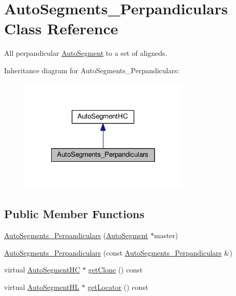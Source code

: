 \hypertarget{classKatabatic_1_1AutoSegments__Perpandiculars}{}\section{Auto\+Segments\+\_\+\+Perpandiculars Class Reference}
\label{classKatabatic_1_1AutoSegments__Perpandiculars}


All perpandicular \hyperlink{classKatabatic_1_1AutoSegment}{Auto\+Segment} to a set of aligneds.  




Inheritance diagram for Auto\+Segments\+\_\+\+Perpandiculars\+:\nopagebreak
\begin{figure}[H]
\begin{center}
\leavevmode
\includegraphics[width=230pt]{classKatabatic_1_1AutoSegments__Perpandiculars__inherit__graph}
\end{center}
\end{figure}
\subsection*{Public Member Functions}
\begin{DoxyCompactItemize}
\item 
\hyperlink{classKatabatic_1_1AutoSegments__Perpandiculars_ab5cb1a0042b95cb6bd56997cdfbf0e6f}{Auto\+Segments\+\_\+\+Perpandiculars} (\hyperlink{classKatabatic_1_1AutoSegment}{Auto\+Segment} $\ast$master)
\item 
\hyperlink{classKatabatic_1_1AutoSegments__Perpandiculars_ac2d21dfaa510352fb5c1bd9aa9bd6f94}{Auto\+Segments\+\_\+\+Perpandiculars} (const \hyperlink{classKatabatic_1_1AutoSegments__Perpandiculars}{Auto\+Segments\+\_\+\+Perpandiculars} \&)
\item 
virtual \hyperlink{namespaceKatabatic_acb3628dc7705fefe38a665cfe43efa6e}{Auto\+Segment\+HC} $\ast$ \hyperlink{classKatabatic_1_1AutoSegments__Perpandiculars_a5b26b0698bdcb40cbf51b250dfb21858}{get\+Clone} () const
\item 
virtual \hyperlink{namespaceKatabatic_a40ef13471fd0e797b75d3c436813fe65}{Auto\+Segment\+HL} $\ast$ \hyperlink{classKatabatic_1_1AutoSegments__Perpandiculars_a07665c070fcc269aec02ce842f384483}{get\+Locator} () const
\end{DoxyCompactItemize}


